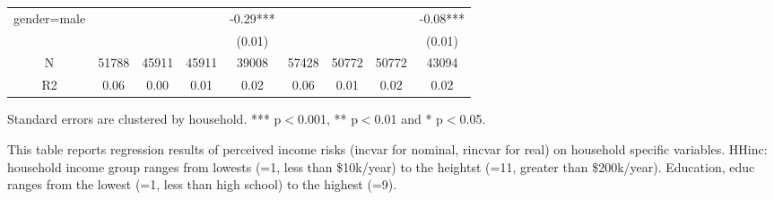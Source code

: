 \begin{table}[p]
\begin{adjustbox}{width=\textwidth}
\begin{threeparttable}
\begin{tabular}{ccccccccc}
gender=male      &           &           &            &    -0.29*** &          &           &            &    -0.08*** \\
                 &           &           &            &      (0.01) &          &           &            &      (0.01) \\
N                &     51788 &     45911 &      45911 &       39008 &    57428 &     50772 &      50772 &       43094 \\
R2               &      0.06 &      0.00 &       0.01 &        0.02 &     0.06 &      0.01 &       0.02 &        0.02 \\
\bottomrule
\end{tabular}
\begin{tablenotes}\item Standard errors are clustered by household. *** p$<$0.001, ** p$<$0.01 and * p$<$0.05. 
\item This table reports regression results of perceived income risks (incvar for nominal, rincvar for real) on household specific variables. HHinc: household income group ranges from lowests (=1, less than \$10k/year) to the heightst (=11, greater than \$200k/year). Education, educ ranges from the lowest (=1, less than high school) to the highest (=9).
\end{tablenotes}
\end{threeparttable}
\end{adjustbox}
\end{table}